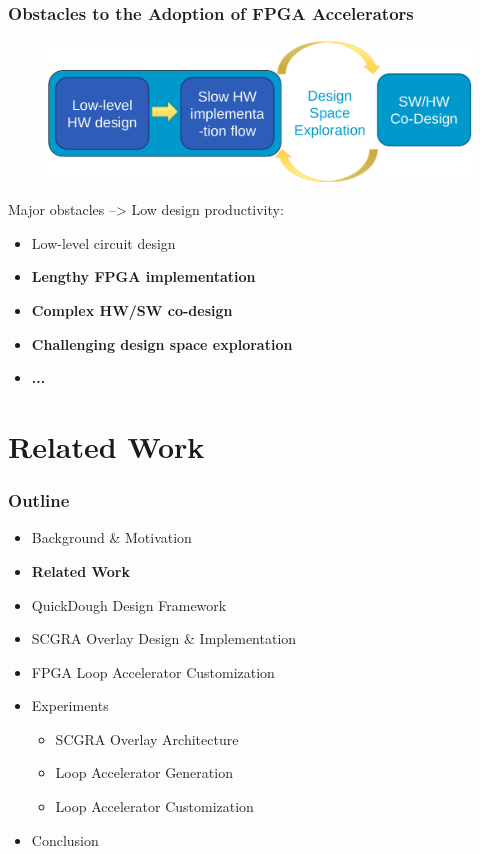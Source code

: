 \documentclass[accentcolor=tud1a,colorbacktitle,inverttitle,landscape,german,presentation,t]{tudbeamer}
\begin{document}
   \begin{frame}
   \frametitle{Obstacles to the Adoption of FPGA Accelerators}
   \begin{figure}
      \includegraphics[width=.7\linewidth]{fpga-challenge-overview}
   \end{figure}

   Major obstacles --> Low design productivity:
   \begin{itemize}
   \item Low-level circuit design
   \item \textbf{Lengthy FPGA implementation}
   \item \textbf{Complex HW/SW co-design}
   \item \textbf{Challenging design space exploration}
   \item \textbf{...}
   \end{itemize}
   \end{frame}
   
\section{Related Work}
  \begin{frame}
  \frametitle{Outline}
  \begin{itemize}
  \setlength{\itemsep}{6pt}
  \item Background \& Motivation
  \item \textbf{Related Work}
  \item QuickDough Design Framework
  \item SCGRA Overlay Design \& Implementation
  \item FPGA Loop Accelerator Customization
  \item Experiments
  \begin{itemize}
    \setlength{\itemsep}{6pt}
    \item SCGRA Overlay Architecture
    \item Loop Accelerator Generation
    \item Loop Accelerator Customization
  \end{itemize}
  \item Conclusion
  \end{itemize}
  \end{frame}
\end{document}
